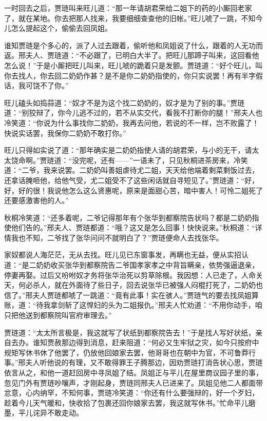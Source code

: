 \documentclass[12pt,oneside]{book}
\begin{document}
一时回去之后，贾琏叫来旺儿道：“那一年请胡君荣给二姐下的药的小厮回老家了，就在某地。你去把那人找来，我要细细查查他的旧帐。”旺儿唬了一跳，不知今儿怎么提起这个，偷偷去回凤姐。

谁知贾琏是个多心的，派了人过去跟着，偷听他和凤姐说了什么，跟着的人无功而返。邢夫人、贾琏道：“不必跟了，已明白大半了。把旺儿那蹄子叫来，这回看他怎么说！”于是小厮把旺儿叫来，旺儿唬的跪着只是发颤。贾琏道：“好个旺儿，叫你去找人，你去回二奶奶作甚？是不是你二奶奶指使的，你只实说罢！再有半字假话，我可饶不了你。”

旺儿磕头如捣蒜道：“奴才不是为这个找二奶奶的，奴才是为了别的事。”贾琏道：“别狡辩了，你今儿逃不过的，若不从实交代，看我不打断你的腿！”邢夫人也冷笑道：“你说为什么事找你二奶奶，我再去问他，若说的不一样，岂不败露了！快说实话罢，我保你二奶奶不敢打你。”

旺儿只得如实说了道：“那年确实是二奶奶指使人请的胡君荣，与小的无干，请太太饶命啊。”贾琏道：“没完呢，还有——”一语未了，只见秋桐进茶房来，冷笑道：“二爷，我来说罢。二奶奶叫善姐虐待尤二姐，天天给他端着剩菜剩饭过去，还拿话腌咂他，给他气受，尤二姐受不了这些闲话就自寻短见了。”贾琏道：“好，好，好的很！我说他怎么这么贤惠呢，原来是面甜心苦，暗中害人！可怜二姐死了还要感激害他的人。”

秋桐冷笑道：“还多着呢，二爷记得那年有个张华到都察院告状吗？都是二奶奶指使他们告的。”邢夫人、贾琏都道：“哦？这又是怎么回事！快快说来。”秋桐道：“详情我也不知，二爷找了张华问问不就明白了？”贾琏便命人去找张华。

家奴都说人海茫茫，无从去找。旺儿见已东窗事发，再瞒也无益，便从实招认道：“是二奶奶收买张华到都察院告二爷国孝家孝之中背旨瞒亲，依势强逼退亲，停妻再娶。过后又吩咐奴才务将张华治死以剪草除根。我因想：人已走了，人命关天，何必杀人，就在外面待了些日子，回去说张华已被强人闷棍打死了，二奶奶也信了。”邢夫人贾琏都唬了一跳道：“竟有此事！实在骇人。”贾琏气的要去找凤姐算账，道：“待我拿剑斩了这悍妇的头为二姐报仇。”邢夫人忙劝道：“不用你动手，咱只把他送到都察院叫官府审理去。”

贾琏道：“太太所言极是，我这就写了状纸到都察院告去！”于是找人写好状纸，亲自去办。谁知贾赦那边得到消息，赶来阻道：“何必又生牢狱之灾，如今只按府中规矩写休书休了他罢了，仍放他回娘家去罢，他哥哥也在朝中为官，不可鲁莽行事。”邢夫人听他说的有理，又不敢得罪王子腾那边，因劝贾琏打消告状心思，贾琏依言从之，和他一道赶回房中寻凤姐了结。凤姐正与平儿在屋里商议园子里的事，忽见门外有贾琏吵嚷声，才刚起身，贾琏同邢夫人已进来了。凤姐见他二人都面带忿意，心内纳罕，不知何事，贾琏冷笑道：“你还有什么要强辩的，好一个歹妇，趁着今儿天气暖和，快收拾了包裹还回你娘家去罢，我这就写休书。”忙命平儿磨墨，平儿诧异不敢走动。
\end{document}
